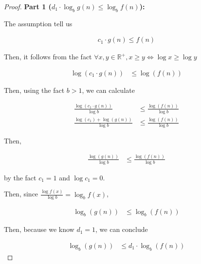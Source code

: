 \documentclass[12pt]{article}
\begin{document}
\begin{enumerate}[a.]
\begin{proof}
        \textbf{Part 1 ($d_1 \cdot \log_b g(n) \leq \log_b f(n)$):}

        \bigskip

        The assumption tell us

        \begin{align}
            c_1 \cdot g(n) \leq f(n)
        \end{align}

        \bigskip

        Then, it follows from the fact $\forall x,y \in \mathbb{R}^{+}, x \geq y
        \Leftrightarrow \log x \geq \log y$

        \begin{align}
            \log (c_1 \cdot g(n)) &\leq \log (f(n))
        \end{align}

        \bigskip

        Then, using the fact $b > 1$, we can calculate

        \begin{align}
            \frac{\log (c_1 \cdot g(n))}{\log b} &\leq \frac{\log (f(n))}{\log b}\\
            \frac{\log (c_1) + \log (g(n))}{\log b} &\leq \frac{\log (f(n))}{\log b}
        \end{align}

        \bigskip

        Then,

        \begin{align}
            \frac{\log (g(n))}{\log b} &\leq \frac{\log (f(n))}{\log b}
        \end{align}

        by the fact $c_1 = 1$ and $\log c_1 = 0$.

        \bigskip

        Then, since $\frac{\log f(x)}{\log b} = \log_b f(x)$,

        \begin{align}
            \log_b (g(n)) &\leq \log_b (f(n))
        \end{align}

        \bigskip

        Then, because we know $d_1 = 1$, we can conclude

        \begin{align}
            \log_b (g(n)) &\leq d_1 \cdot \log_b (f(n))
        \end{align}


        \bigskip


\end{proof}
\end{enumerate}
\end{document}
